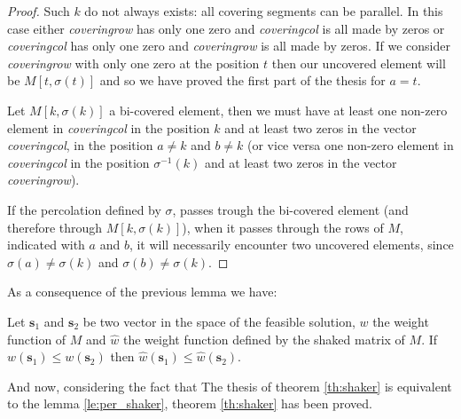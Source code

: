 \documentclass[12pt]{ClasseMatematicamente}
\begin{document}
\begin{proof}
 Such $k$ do not always exists: all covering segments can be parallel. In this case either \emph{covering\textunderscore row} has only one zero and \emph{covering\textunderscore col} is all made by zeros or \emph{covering\textunderscore col} has only one zero and \emph{covering\textunderscore row} is all made by zeros. If we consider \emph{covering\textunderscore row} with only one zero at the position $t$ then our uncovered element will be $M[t, \sigma(t)]$ and so we have proved the first part of the thesis for $a=t$. 
 
 Let $M[k, \sigma(k)]$ a bi-covered element, then we must have at least one non-zero element in \emph{covering\textunderscore col} in the position $k$ and at least two zeros in the vector \emph{covering\textunderscore col}, in the position $a \neq k$ and $b \neq k$ (or vice versa one non-zero element in \emph{covering\textunderscore col} in the position $\sigma^{-1}(k)$ and at least two zeros in the vector \emph{covering\textunderscore row}).
 
 If the percolation defined by $\sigma$, passes trough the bi-covered element (and therefore through $M[k, \sigma(k)]$), when it passes through the rows of $M$, indicated with $a$ and $b$, it will necessarily encounter two uncovered elements, since $ \sigma(a) \neq \sigma(k)$ and $ \sigma(b) \neq \sigma(k)$.
\end{proof}
As a consequence of the previous lemma we have:
\begin{lemma}\label{le:per_shaker}
 Let $\mathbf{s}_1$ and $\mathbf{s}_2$ be two vector in the space of the feasible solution, $w$ the weight function of $M$ and $\hat{w}$ the weight function defined by the shaked matrix of $M$. If $w(\mathbf{s}_1) \leq w(\mathbf{s}_2)$ then $\hat{w}(\mathbf{s}_1) \leq \hat{w}(\mathbf{s}_2)$.
\end{lemma}
And now, considering the fact that The thesis of theorem \ref{th:shaker} is equivalent to the lemma \ref{le:per_shaker}, theorem \ref{th:shaker} has been proved.
\end{document}
